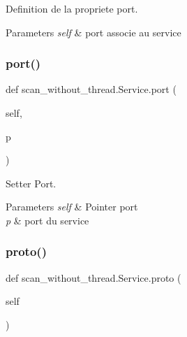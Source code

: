 Definition de la propriete port. 


\begin{DoxyParams}{Parameters}
{\em self} & port associe au service \\
\hline
\end{DoxyParams}
\hypertarget{classscan__without__thread_1_1Service_a093db968d545662d0003af1047898470}{}\label{classscan__without__thread_1_1Service_a093db968d545662d0003af1047898470} 
\subsubsection{\texorpdfstring{port()}{port()}\hspace{0.1cm}{\footnotesize\ttfamily [2/2]}}
{\footnotesize\ttfamily def scan\+\_\+without\+\_\+thread.\+Service.\+port (\begin{DoxyParamCaption}\item[{}]{self,  }\item[{}]{p }\end{DoxyParamCaption})}



Setter Port. 


\begin{DoxyParams}{Parameters}
{\em self} & Pointer port \\
\hline
{\em p} & port du service \\
\hline
\end{DoxyParams}
\hypertarget{classscan__without__thread_1_1Service_af8f2466514fa8fcff62c04bf194b7767}{}\label{classscan__without__thread_1_1Service_af8f2466514fa8fcff62c04bf194b7767} 
\subsubsection{\texorpdfstring{proto()}{proto()}\hspace{0.1cm}{\footnotesize\ttfamily [1/2]}}
{\footnotesize\ttfamily def scan\+\_\+without\+\_\+thread.\+Service.\+proto (\begin{DoxyParamCaption}\item[{}]{self }\end{DoxyParamCaption})}



